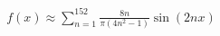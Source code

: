 \documentclass[preview]{standalone}
\begin{document}
\begin{align*}
f(x) \approx \sum_{n=1}^{152} \frac{8n}{\pi(4n^2-1)} \sin(2nx)
\end{align*}
\end{document}
